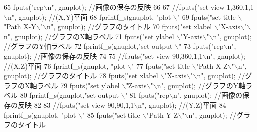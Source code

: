 \begin{DoxyCode}
{{65     fputs(\textcolor{stringliteral}{"rep\(\backslash\)n"}, gnuplot); \textcolor{comment}{//画像の保存の反映}
66 
67     \textcolor{comment}{//fputs("set view 1,360,1,1\(\backslash\)n", gnuplot); //(X,Y)平面}
68     fprintf\_s(gnuplot, \textcolor{stringliteral}{"plot \(\backslash\)"%
69     fputs(\textcolor{stringliteral}{"set title \(\backslash\)"Path X-Y\(\backslash\)"\(\backslash\)n"}, gnuplot); \textcolor{comment}{//グラフのタイトル}
70     fputs(\textcolor{stringliteral}{"set xlabel \(\backslash\)"X-axis\(\backslash\)"\(\backslash\)n"}, gnuplot); \textcolor{comment}{//グラフのX軸ラベル}
71     fputs(\textcolor{stringliteral}{"set ylabel \(\backslash\)"Y-axis\(\backslash\)"\(\backslash\)n"}, gnuplot); \textcolor{comment}{//グラフのY軸ラベル}
72     fprintf\_s(gnuplot,\textcolor{stringliteral}{"set output \(\backslash\)"%
73     fputs(\textcolor{stringliteral}{"rep\(\backslash\)n"}, gnuplot); \textcolor{comment}{//画像の保存の反映}
74     
75     \textcolor{comment}{//fputs("set view 90,360,1,1\(\backslash\)n", gnuplot); //(X,Z)平面}
76     fprintf\_s(gnuplot, \textcolor{stringliteral}{"plot \(\backslash\)"%
77     fputs(\textcolor{stringliteral}{"set title \(\backslash\)"Path X-Z\(\backslash\)"\(\backslash\)n"}, gnuplot); \textcolor{comment}{//グラフのタイトル}
78     fputs(\textcolor{stringliteral}{"set xlabel \(\backslash\)"X-axis\(\backslash\)"\(\backslash\)n"}, gnuplot); \textcolor{comment}{//グラフのX軸ラベル}
79     fputs(\textcolor{stringliteral}{"set ylabel \(\backslash\)"Z-axis\(\backslash\)"\(\backslash\)n"}, gnuplot); \textcolor{comment}{//グラフのY軸ラベル}
80     fprintf\_s(gnuplot,\textcolor{stringliteral}{"set output \(\backslash\)"%
81     fputs(\textcolor{stringliteral}{"rep\(\backslash\)n"}, gnuplot); \textcolor{comment}{//画像の保存の反映}
82 
83     \textcolor{comment}{//fputs("set view 90,90,1,1\(\backslash\)n", gnuplot); //(Y,Z)平面}
84     fprintf\_s(gnuplot, \textcolor{stringliteral}{"plot \(\backslash\)"%
85     fputs(\textcolor{stringliteral}{"set title \(\backslash\)"Path Y-Z\(\backslash\)"\(\backslash\)n"}, gnuplot); \textcolor{comment}{//グラフのタイトル}
}}}}}}}
\end{DoxyCode}
